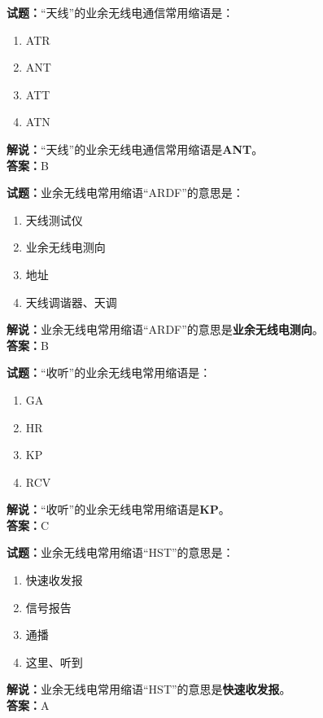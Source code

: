 \documentclass{ctexbook}
\begin{document}
\bigskip


\noindent\textbf{试题：}“天线”的业余无线电通信常用缩语是：
\begin{enumerate}[leftmargin=3em]
\item ATR
\item ANT
\item ATT
\item ATN
\end{enumerate}
\noindent\textbf{解说：}“天线”的业余无线电通信常用缩语是\textbf{ANT}。\\\noindent\textbf{答案：}B



\bigskip


\noindent\textbf{试题：}业余无线电常用缩语“ARDF”的意思是：
\begin{enumerate}[leftmargin=3em]
\item 天线测试仪
\item 业余无线电测向
\item 地址
\item 天线调谐器、天调
\end{enumerate}
\noindent\textbf{解说：}业余无线电常用缩语“ARDF”的意思是\textbf{业余无线电测向}。\\\noindent\textbf{答案：}B



\bigskip


\noindent\textbf{试题：}“收听”的业余无线电常用缩语是：
\begin{enumerate}[leftmargin=3em]
\item GA
\item HR
\item KP
\item RCV
\end{enumerate}
\noindent\textbf{解说：}“收听”的业余无线电常用缩语是\textbf{KP}。\\\noindent\textbf{答案：}C

\bigskip


\noindent\textbf{试题：}业余无线电常用缩语“HST”的意思是：
\begin{enumerate}[leftmargin=3em]
\item 快速收发报
\item 信号报告
\item 通播
\item 这里、听到
\end{enumerate}
\noindent\textbf{解说：}业余无线电常用缩语“HST”的意思是\textbf{快速收发报}。\\\noindent\textbf{答案：}A
\end{document}

